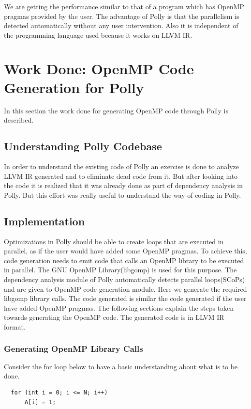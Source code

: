 \documentclass[a4paper,10pt]{article}
\begin{document}
We are getting the performance similar to that of a program which has OpenMP
pragmas provided by the user. The advantage of Polly is that the parallelism 
is detected automatically without any user intervention. Also it is independent
of the programming language used because it works on LLVM IR.

\section{Work Done: OpenMP Code Generation for Polly}
In this section the work done for generating OpenMP code through Polly is 
described.
\subsection{Understanding Polly Codebase}
In order to understand the existing code of Polly an exercise is done to analyze
LLVM IR generated and to eliminate dead code from it. But after looking into the
code it is realized that it was already done as part of dependency analysis in
Polly. But this effort was really useful to understand the way of coding in Polly.
\subsection{Implementation}
Optimizations in Polly should be able to create loops that are executed in
parallel, as if the user would have added some OpenMP pragmas. To achieve this,
code generation needs to emit code that calls an OpenMP library to be executed
in parallel. The GNU OpenMP Library(libgomp) is used for this purpose. 
The dependency analysis module of Polly automatically 
detects parallel loops(SCoPs) and are given to OpenMP code generation module. 
Here we generate the required libgomp library calls. The code generated is 
similar the code generated if the user have added OpenMP pragmas\cite{parfor}.
The following sections explain the steps taken towards generating the OpenMP
code.  The generated code is in LLVM IR format. 

\subsubsection{Generating OpenMP Library Calls}
Consider the for loop below to have a basic understanding about what is to be done.

{\footnotesize
\begin{lstlisting}
  for (int i = 0; i <= N; i++)
      A[i] = 1;
\end{lstlisting}
}
\end{document}

